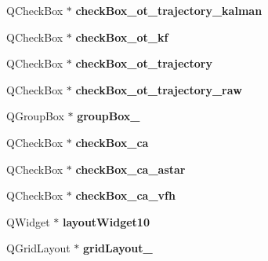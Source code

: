 \begin{DoxyCompactItemize}
\item 
\hypertarget{class_ui___main_window_a5c6d40b788691613b5bd2427cf0c7012}{}Q\+Check\+Box $\ast$ {\bfseries check\+Box\+\_\+ot\+\_\+trajectory\+\_\+kalman}\label{class_ui___main_window_a5c6d40b788691613b5bd2427cf0c7012}

\item 
\hypertarget{class_ui___main_window_a781c6e86964f1387d2f43c81d36ca9e1}{}Q\+Check\+Box $\ast$ {\bfseries check\+Box\+\_\+ot\+\_\+kf}\label{class_ui___main_window_a781c6e86964f1387d2f43c81d36ca9e1}

\item 
\hypertarget{class_ui___main_window_abf094cb2744384a6eecc2a07aef43688}{}Q\+Check\+Box $\ast$ {\bfseries check\+Box\+\_\+ot\+\_\+trajectory}\label{class_ui___main_window_abf094cb2744384a6eecc2a07aef43688}

\item 
\hypertarget{class_ui___main_window_a68d971cd3693147053b452a1c91128ac}{}Q\+Check\+Box $\ast$ {\bfseries check\+Box\+\_\+ot\+\_\+trajectory\+\_\+raw}\label{class_ui___main_window_a68d971cd3693147053b452a1c91128ac}

\item 
\hypertarget{class_ui___main_window_ad8a919e5634add9c41bfc319cb9fd338}{}Q\+Group\+Box $\ast$ {\bfseries group\+Box\+\_}\label{class_ui___main_window_ad8a919e5634add9c41bfc319cb9fd338}

\item 
\hypertarget{class_ui___main_window_afa8b1c11258d1b5fbf209cdbe99805b6}{}Q\+Check\+Box $\ast$ {\bfseries check\+Box\+\_\+ca}\label{class_ui___main_window_afa8b1c11258d1b5fbf209cdbe99805b6}

\item 
\hypertarget{class_ui___main_window_a639cb67bffcd8f729df5cde0877feb51}{}Q\+Check\+Box $\ast$ {\bfseries check\+Box\+\_\+ca\+\_\+astar}\label{class_ui___main_window_a639cb67bffcd8f729df5cde0877feb51}

\item 
\hypertarget{class_ui___main_window_aa408c7e16953f8329ef35ca534377fe6}{}Q\+Check\+Box $\ast$ {\bfseries check\+Box\+\_\+ca\+\_\+vfh}\label{class_ui___main_window_aa408c7e16953f8329ef35ca534377fe6}

\item 
\hypertarget{class_ui___main_window_ac71e43c9a7d3f7dd9c4d80ad91ef3e1d}{}Q\+Widget $\ast$ {\bfseries layout\+Widget10}\label{class_ui___main_window_ac71e43c9a7d3f7dd9c4d80ad91ef3e1d}

\item 
\hypertarget{class_ui___main_window_a6b2a0c5f7e8ff2a87134908dd770d2d2}{}Q\+Grid\+Layout $\ast$ {\bfseries grid\+Layout\+\_}\label{class_ui___main_window_a6b2a0c5f7e8ff2a87134908dd770d2d2}


\end{DoxyCompactItemize}
